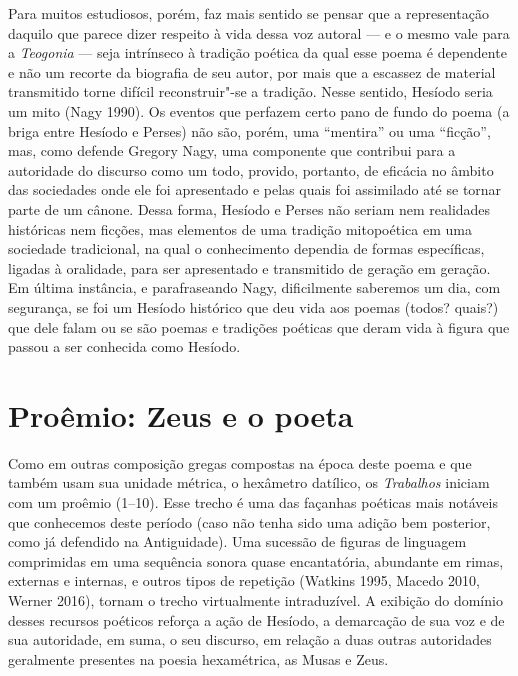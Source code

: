 Para muitos estudiosos, porém, faz mais sentido se pensar que a
representação daquilo que parece dizer respeito à vida dessa voz autoral
--- e o mesmo vale para a \emph{Teogonia} --- seja intrínseco à tradição
poética da qual esse poema é dependente e não um recorte da biografia de
seu autor, por mais que a escassez de material transmitido torne difícil
reconstruir"-se a tradição. Nesse sentido, Hesíodo seria um mito (Nagy
1990). Os eventos que perfazem certo pano de fundo do poema (a briga
entre Hesíodo e Perses) não são, porém, uma ``mentira'' ou uma
``ficção'', mas, como defende Gregory Nagy, uma componente que contribui
para a autoridade do discurso como um todo, provido, portanto, de
eficácia no âmbito das sociedades onde ele foi apresentado e pelas quais
foi assimilado até se tornar parte de um cânone. Dessa forma, Hesíodo e
Perses não seriam nem realidades históricas nem ficções, mas elementos
de uma tradição mitopoética em uma sociedade tradicional, na qual o
conhecimento dependia de formas específicas, ligadas à oralidade, para
ser apresentado e transmitido de geração em geração. Em última
instância, e parafraseando Nagy, dificilmente saberemos um dia, com
segurança, se foi um Hesíodo histórico que deu vida aos poemas (todos?
quais?) que dele falam ou se são poemas e tradições poéticas que deram
vida à figura que passou a ser conhecida como Hesíodo.



\section{Proêmio: Zeus e o poeta}

Como em outras composição gregas compostas na época deste poema e que
também usam sua unidade métrica, o hexâmetro datílico, os
\emph{Trabalhos} iniciam com um proêmio (1--10). Esse trecho é uma das
façanhas poéticas mais notáveis que conhecemos deste período (caso não
tenha sido uma adição bem posterior, como já defendido na Antiguidade).
Uma sucessão de figuras de linguagem comprimidas em uma sequência sonora
quase encantatória, abundante em rimas, externas e internas, e outros
tipos de repetição (Watkins 1995, Macedo 2010, Werner 2016), tornam o
trecho virtualmente intraduzível. A exibição do domínio desses recursos
poéticos reforça a ação de Hesíodo, a demarcação de sua voz e de sua
autoridade, em suma, o seu discurso, em relação a duas outras
autoridades geralmente presentes na poesia hexamétrica, as Musas e Zeus.

